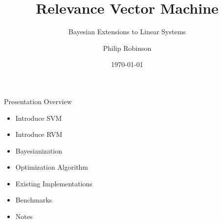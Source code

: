 \documentclass[10pt]{beamer}
\title{Relevance Vector Machine}
\subtitle{Bayesian Extensions to Linear Systems}
\author{Philip Robinson}
\date{\today}
\institute{Presented to \\ OHSU - Machine Learning Class}
\begin{document}
\begin{frame}
  \titlepage
\end{frame}


\begin{frame}{Presentation Overview}

  \begin{itemize}
  \item Introduce SVM
  \item Introduce RVM
  \item Bayesianization
  \item Optimization Algorithm
  \item Existing Implementations
  \item Benchmarks
  \item Notes
  \end{itemize}
\end{frame}
\end{document}
